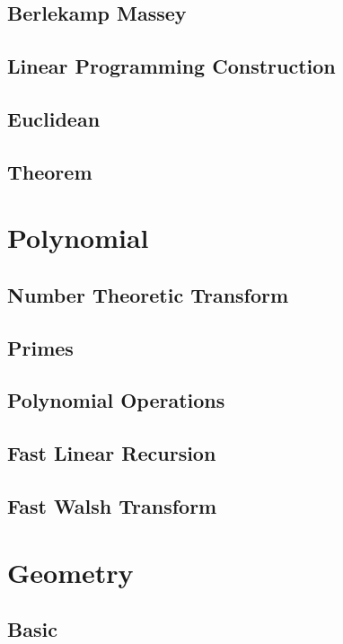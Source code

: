 \subsection{Berlekamp Massey}

\subsection{Linear Programming Construction}

\subsection{Euclidean}

\subsection{Theorem}


\section{Polynomial}
\subsection{Number Theoretic Transform}

\subsection{Primes}

\subsection{Polynomial Operations}

\subsection{Fast Linear Recursion}

\subsection{Fast Walsh Transform}


\section{Geometry}
\subsection{Basic}

